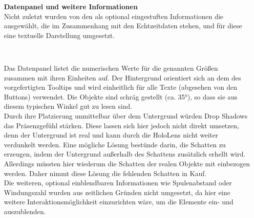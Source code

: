 \textbf{Datenpanel und weitere Informationen}\\
Nicht zuletzt wurden von den als optional eingestuften Informationen die ausgewählt, die im Zusammenhang mit den Echtzeitdaten stehen, und für diese eine textuelle Darstellung umgesetzt.
\vspace{4px}
\begin{center}
	\\
\end{center}
\vspace{6px}
Das Datenpanel listet die numerischen Werte für die genannten Größen zusammen mit ihren Einheiten auf. Der Hintergrund orientiert sich an dem des vorgefertigten Tooltips und wird einheitlich für alle Texte (abgesehen von den Buttons) verwendet. Die Objekte sind schräg gestellt (ca. 35°), so dass sie aus diesem typischen Winkel gut zu lesen sind.\\

Durch ihre Platzierung unmittelbar über dem Untergrund würden Drop Shadows das Präsenzgefühl stärken. Diese lassen sich hier jedoch nicht direkt umsetzen, denn der Untergrund ist real und kann durch die HoloLens nicht weiter verdunkelt werden. Eine mögliche Lösung bestünde darin, die Schatten zu erzeugen, indem der Untergrund außerhalb des Schattens zusätzlich erhellt wird. Allerdings müssten hier wiederum die Schatten der realen Objekte mit einbezogen werden. Daher nimmt diese Lösung die fehlenden Schatten in Kauf.\\

Die weiteren, optional einblendbaren Informationen wie Spulenabstand oder Windungszahl wurden aus zeitlichen Gründen nicht umgesetzt, da hier eine weitere Interaktionsmöglichkeit einzurichten wäre, um die Elemente ein- und auszublenden.

